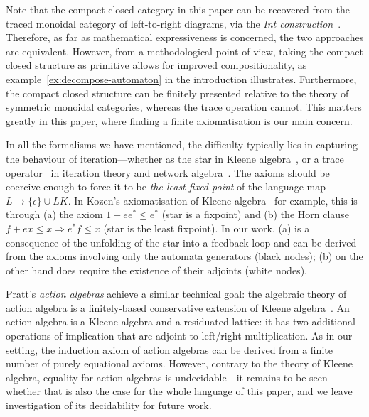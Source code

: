 \documentclass{lmcs}
\theoremstyle{plain}\newtheorem{satz}[thm]{Satz} %
\begin{document}
Note that the compact closed category in this paper can be recovered from the traced monoidal category of left-to-right diagrams, via the \emph{Int construction}~\cite{Joyal_tracedcategories}. Therefore, as far as mathematical expressiveness is concerned, the two approaches are equivalent. However, from a methodological point of view, taking the compact closed structure as primitive allows for improved compositionality, as example~\eqref{ex:decompose-automaton} in the introduction illustrates. Furthermore, the compact closed structure can be finitely presented relative to the theory of symmetric monoidal categories, whereas the trace operation cannot. This matters greatly in this paper, where finding a finite axiomatisation is our main concern.


In all the formalisms we have mentioned, the difficulty typically lies in capturing the behaviour of iteration---whether as the star in Kleene algebra~\cite{kozen1994completeness,bloom1993equational}, or a trace operator~\cite{bloom1993iteration} in iteration theory and network algebra~\cite{stefanescu2000network}. The axioms should be coercive enough to force it to be \emph{the least fixed-point} of the language map $L\mapsto \{\epsilon\} \cup LK$. In Kozen's axiomatisation of Kleene algebra~\cite{kozen1994completeness} for example, this is through (a) the axiom $1+ ee^*\leq e^*$ (star is a fixpoint) and (b) the Horn clause $f+ex \leq x \Rightarrow  e^*f \leq x$ (star is the least fixpoint). In our work, (a) is a consequence of the unfolding of the star into a feedback loop and can be derived from the axioms involving only the automata generators (black nodes); (b) on the other hand does require the existence of their adjoints (white nodes).

Pratt's \emph{action algebras} achieve a similar technical goal: the algebraic theory of action algebra is a finitely-based conservative extension of Kleene algebra~\cite{pratt1990action}. An action algebra is a Kleene algebra and a residuated lattice: it has two additional operations of implication that are adjoint to left/right multiplication. As in our setting, the induction axiom of action algebras can be derived from a finite number of purely equational axioms. However, contrary to the theory of Kleene algebra, equality for action algebras is undecidable---it remains to be seen whether that is also the case for the whole language of this paper, and we leave investigation of its decidability for future work.
\end{document}
